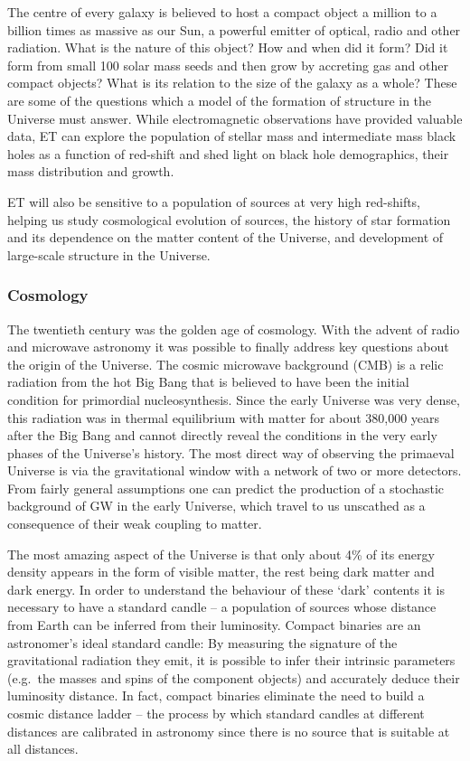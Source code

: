 The centre of every galaxy is believed to host a compact
object a million to a billion times as massive as our Sun,
a powerful emitter of optical, radio and other radiation.
What is the nature of this object? How and when did it form?
Did it form from small 100 solar mass seeds and then grow
by accreting gas and other compact objects? What is its
relation to the size of the galaxy as a whole? These are some
of the questions which a model of the formation of structure in
the Universe must answer.  While electromagnetic observations 
have provided valuable data, ET can explore the population of 
stellar mass and intermediate mass black holes as a function 
of red-shift and shed light on black hole demographics, their 
mass distribution and growth.

ET will also be sensitive to
a population of sources at very high red-shifts, helping us
study cosmological evolution of sources, the history of star
formation and its dependence on the matter content of
the Universe, and development of large-scale structure in the
Universe.

\FloatBarrier
\subsubsection{Cosmology}
The twentieth century was the golden age of cosmology. With
the advent of radio and microwave astronomy it was possible to
finally address key questions about the origin of the
Universe.  The cosmic microwave background (CMB) is a relic radiation
from the hot Big Bang that is believed to have been the
initial condition for primordial nucleosynthesis. Since the early
Universe was very dense, this radiation was in thermal
equilibrium with matter for about 380,000 years after the Big
Bang and cannot directly reveal the conditions in the very
early phases of the Universe's history. The most direct way of
observing the primaeval Universe is via the gravitational
window with a network of two or more detectors. From fairly
general assumptions one can predict the production of
a stochastic background of GW in the early Universe, which travel
to us unscathed as a consequence of their weak coupling to matter.

The most amazing aspect of the Universe is that only about
4\% of its energy density appears in the form of visible matter,
the rest being dark matter and dark energy.
In order to understand the behaviour of these `dark' contents
it is necessary to have a standard candle -- a population of
sources whose distance from Earth can be inferred from their
luminosity.
Compact binaries are an astronomer's ideal standard candle:
By measuring the signature of the gravitational radiation they emit,
it is possible to infer their intrinsic parameters (e.g.\ the
masses and spins of the component objects) and accurately
deduce their luminosity distance. In fact, compact binaries
eliminate the need to build a cosmic distance ladder -- the
process by which standard candles at different distances are
calibrated in astronomy since there is no source that is
suitable at all distances.

